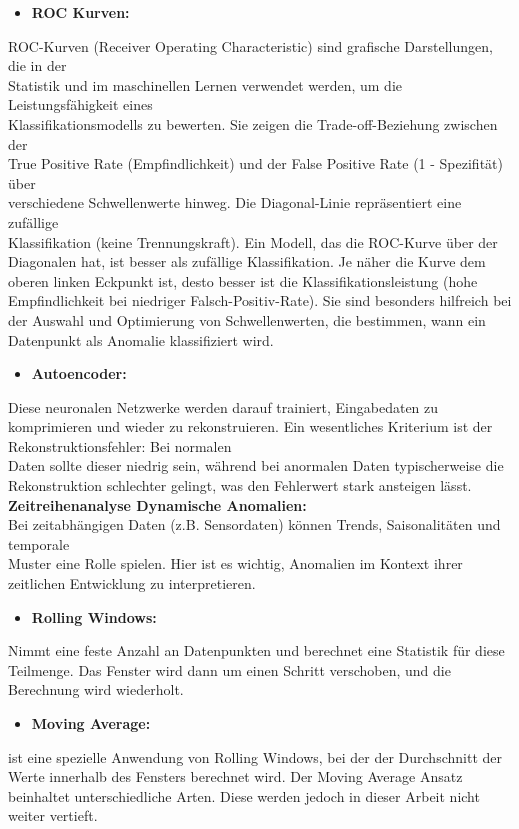 \begin{itemize} \item \textbf{ROC Kurven:}\end{itemize} ROC-Kurven (Receiver Operating Characteristic) sind grafische Darstellungen, die in der \\ Statistik und im maschinellen Lernen verwendet werden, um die Leistungsfähigkeit eines \\ Klassifikationsmodells zu bewerten. Sie zeigen die Trade-off-Beziehung zwischen der \\ True Positive Rate (Empfindlichkeit) und der False Positive Rate (1 - Spezifität) über \\ verschiedene Schwellenwerte hinweg. Die Diagonal-Linie repräsentiert eine zufällige \\ Klassifikation (keine Trennungskraft). Ein Modell, das die ROC-Kurve über der Diagonalen hat, ist besser als zufällige Klassifikation. Je näher die Kurve dem oberen linken Eckpunkt ist, desto besser ist die Klassifikationsleistung (hohe Empfindlichkeit bei niedriger Falsch-Positiv-Rate). Sie sind besonders hilfreich bei der Auswahl und Optimierung von Schwellenwerten, die bestimmen, wann ein Datenpunkt als Anomalie klassifiziert wird\cite{ROC}.
\\
\begin{itemize} \item \textbf{Autoencoder:}\end{itemize}
Diese neuronalen Netzwerke werden darauf trainiert, Eingabedaten zu komprimieren und wieder zu rekonstruieren. Ein wesentliches Kriterium ist der Rekonstruktionsfehler: Bei normalen \\ Daten sollte dieser niedrig sein, während bei anormalen Daten typischerweise die Rekonstruktion schlechter gelingt, was den Fehlerwert stark ansteigen lässt\cite{FeatureAutoencoder}.
\nAbsatz
\textbf{Zeitreihenanalyse Dynamische Anomalien:}
\\
Bei zeitabhängigen Daten (z.B. Sensordaten) können Trends, Saisonalitäten und temporale \\ Muster eine Rolle spielen. Hier ist es wichtig, Anomalien im Kontext ihrer zeitlichen Entwicklung zu interpretieren\cite{average}.  \\
\begin{itemize} \item \textbf{Rolling Windows:}\end{itemize} Nimmt eine feste Anzahl an Datenpunkten und berechnet eine Statistik für diese Teilmenge. Das Fenster wird dann um einen Schritt verschoben, und die Berechnung wird wiederholt\cite{Window}. 
\\
\begin{itemize} \item \textbf{Moving Average:}\end{itemize} ist eine spezielle Anwendung von Rolling Windows, bei der der Durchschnitt der Werte innerhalb des Fensters berechnet wird. Der Moving Average Ansatz beinhaltet unterschiedliche Arten. Diese werden jedoch in dieser Arbeit nicht weiter vertieft\cite{average}.
\\
